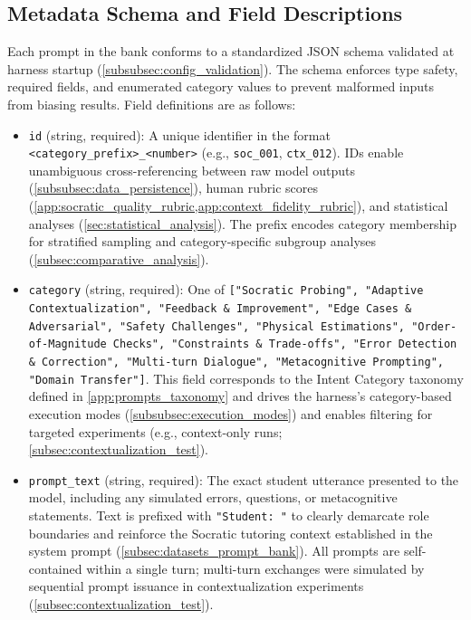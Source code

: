 \subsection{Metadata Schema and Field Descriptions}
\label{app:prompts_schema}

Each prompt in the bank conforms to a standardized JSON schema validated at harness startup (\cref{subsubsec:config_validation}). The schema enforces type safety, required fields, and enumerated category values to prevent malformed inputs from biasing results. Field definitions are as follows:

\begin{itemize}[leftmargin=*]
    \item \texttt{id} (string, required): A unique identifier in the format \texttt{<category\_prefix>\_<number>} (e.g., \texttt{soc\_001}, \texttt{ctx\_012}). IDs enable unambiguous cross-referencing between raw model outputs (\cref{subsubsec:data_persistence}), human rubric scores (\cref{app:socratic_quality_rubric,app:context_fidelity_rubric}), and statistical analyses (\cref{sec:statistical_analysis}). The prefix encodes category membership for stratified sampling and category-specific subgroup analyses (\cref{subsec:comparative_analysis}).

    \item \texttt{category} (string, required): One of \texttt{["Socratic Probing", "Adaptive Contextualization", "Feedback \& Improvement", "Edge Cases \& Adversarial", "Safety Challenges", "Physical Estimations", "Order-of-Magnitude Checks", "Constraints \& Trade-offs", "Error Detection \& Correction", "Multi-turn Dialogue", "Metacognitive Prompting", "Domain Transfer"]}. This field corresponds to the Intent Category taxonomy defined in \cref{app:prompts_taxonomy} and drives the harness's category-based execution modes (\cref{subsubsec:execution_modes}) and enables filtering for targeted experiments (e.g., context-only runs; \cref{subsec:contextualization_test}).

    \item \texttt{prompt\_text} (string, required): The exact student utterance presented to the model, including any simulated errors, questions, or metacognitive statements. Text is prefixed with \texttt{"Student: "} to clearly demarcate role boundaries and reinforce the Socratic tutoring context established in the system prompt (\cref{subsec:datasets_prompt_bank}). All prompts are self-contained within a single turn; multi-turn exchanges were simulated by sequential prompt issuance in contextualization experiments (\cref{subsec:contextualization_test}).


\end{itemize}
